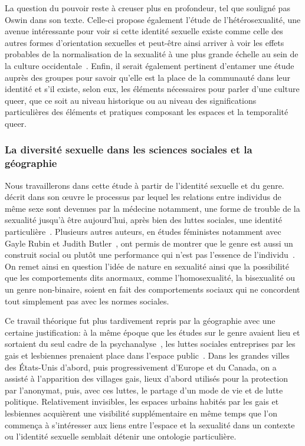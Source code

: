 La question du pouvoir reste à creuser plus en profondeur, tel que souligné pas Oswin dans son texte. 
Celle-ci propose également l'étude de l'hétérosexualité, une avenue intéressante pour voir si cette identité sexuelle existe comme celle des autres formes d'orientation sexuelles et peut-être ainsi arriver à voir les effets probables de la normalisation de la sexualité à une plus grande échelle au sein de la culture occidentale~\citep[100]{Oswin2008}. 
Enfin, il serait également pertinent d’entamer une étude auprès des groupes \lgbt{} pour savoir qu'elle est la place de la communauté dans leur identité et s'il existe, selon eux, les éléments nécessaires pour parler d'une culture queer, que ce soit au niveau historique ou au niveau des significations particulières des éléments et pratiques composant les espaces et la temporalité queer.

\subsubsection{La diversité sexuelle dans les sciences sociales et la
géographie}
\label{ssub:la_diversit_sexuelle_dans_les_sciences_sociales_et_la_g_ographie}
Nous travaillerons dans cette étude à partir de l'identité sexuelle et du genre.
\citet{Foucault2011} décrit dans son œuvre  le processus par lequel les relations entre individus de même sexe sont devenues par la médecine notamment, une forme de trouble de la sexualité jusqu'à être aujourd'hui, après bien des luttes sociales, une identité particulière~\citep{Foucault2011}. 
Plusieurs autres auteurs, en études féministes notamment avec Gayle Rubin et Judith Butler~\citep[98]{Marcus2005}, ont permis de montrer que le genre est aussi un construit social ou plutôt une performance qui n'est pas l'essence de l'individu~\citep{Butler2007}. 
On remet ainsi en question l'idée de nature en sexualité ainsi que la possibilité que les comportements dits anormaux, comme l'homosexualité, la bisexualité ou un genre non-binaire, soient en fait des comportements sociaux qui ne concordent tout simplement pas avec les normes sociales.

Ce travail théorique fut plus tardivement repris par la géographie avec une certaine justification: à la même époque que les études sur le genre avaient lieu et sortaient du seul cadre de la psychanalyse~\citep{Rubin2011a,Rubin2011}, les luttes sociales entreprises par les gais et lesbiennes prenaient place dans l'espace public~\citep[422-427]{Spencer2005}. 
Dans les grandes villes des États-Unis d'abord, puis progressivement d'Europe et du Canada, on a assisté à l'apparition des villages gais, lieux d'abord utilisés pour la protection par l'anonymat, puis, avec ces luttes, le partage d'un mode de vie et de lutte politique. 
Relativement invisibles, les espaces urbains habités par les gais et lesbiennes acquièrent une visibilité supplémentaire en même temps que l'on commença à s'intéresser aux liens entre l'espace et la sexualité dans un contexte ou l'identité sexuelle semblait détenir une ontologie particulière.


